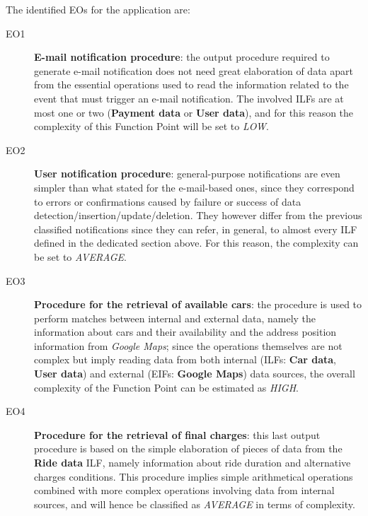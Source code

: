 The identified EOs for the application are:
\begin{description}
\item[EO1] \textbf{E-mail notification procedure}: the output procedure required to generate e-mail notification does not need great elaboration of data apart from the essential operations used to read the information related to the event that must trigger an e-mail notification. The involved ILFs are at most one or two (\textbf{Payment data} or \textbf{User data}), and for this reason the complexity of this Function Point will be set to \textit{LOW}.
\item[EO2] \textbf{User notification procedure}: general-purpose notifications are even simpler than what stated for the e-mail-based ones, since they correspond to errors or confirmations caused by failure or success of data detection/insertion/update/deletion. They however differ from the previous classified notifications since they can refer, in general, to almost every ILF defined in the dedicated section above. For this reason, the complexity can be set to \textit{AVERAGE}.
\item[EO3] \textbf{Procedure for the retrieval of available cars}: the procedure is used to perform matches between internal and external data, namely the information about cars and their availability and the address position information from \textit{Google Maps}; since the operations themselves are not complex but imply reading data from both internal (ILFs: \textbf{Car data}, \textbf{User data}) and external (EIFs: \textbf{Google Maps}) data sources, the overall complexity of the Function Point can be estimated as \textit{HIGH}.
\item[EO4] \textbf{Procedure for the retrieval of final charges}: this last output procedure is based on the simple elaboration of pieces of data from the \textbf{Ride data} ILF, namely information about ride duration and alternative charges conditions. This procedure implies simple arithmetical operations combined with more complex operations involving data from internal sources, and will hence be classified as \textit{AVERAGE} in terms of complexity.
\end{description}


